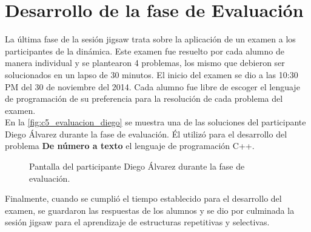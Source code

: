 \section{Desarrollo de la fase de Evaluación}
La última fase de la sesión jigsaw trata sobre la aplicación de un examen a los participantes de la dinámica. Este examen fue resuelto por cada alumno de manera individual y se plantearon 4 problemas, los mismo que debieron ser solucionados en un lapso de 30 minutos. El inicio del examen se dio a las 10:30 PM del 30 de noviembre del 2014. Cada alumno fue libre de escoger el lenguaje de programación de su preferencia para la resolución de cada problema del examen.\\

En la \autoref{fig:c5_evaluacion_diego} se muestra una de las soluciones del participante Diego Álvarez durante la fase de evaluación. Él utilizó para el desarrollo del problema \textbf{De número a texto} el lenguaje de programación C++.\\

\begin{figure}
	\centering
	\caption[Evaluación - Diego Álvarez]{Pantalla del participante Diego Álvarez durante la fase de evaluación.}
	\label{fig:c5_evaluacion_diego}
\end{figure}

Finalmente, cuando se cumplió el tiempo establecido para el desarrollo del examen, se guardaron las respuestas de los alumnos y se dio por culminada la sesión jigsaw para el aprendizaje de estructuras repetitivas y selectivas.